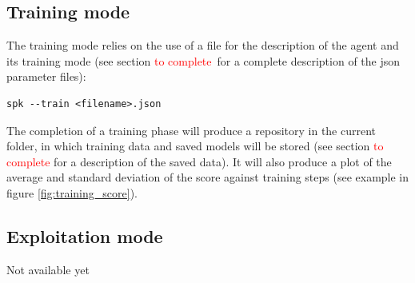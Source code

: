 \subsection{Training mode}

The training mode relies on the use of a  file for the description of the agent and its training mode (see section \textcolor{red}{to complete} for a complete description of the json parameter files):

\begin{verbatim}
spk --train <filename>.json
\end{verbatim}

The completion of a training phase will produce a  repository in the current folder, in which training data and saved models will be stored (see section \textcolor{red}{to complete} for a description of the saved data). It will also produce a plot of the average and standard deviation of the score against training steps (see example in figure \ref{fig:training_score}).

%

\subsection{Exploitation mode}

Not available yet

%
%
%
%
%
